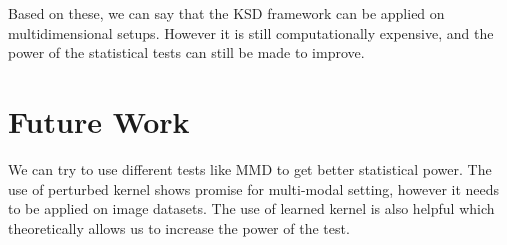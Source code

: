 \documentclass[12pt,a4paper]{report}
\begin{document}
\vspace{0.3cm}
\noindent
Based on these, we can say that the KSD framework can be applied on multidimensional setups. However it is still computationally expensive, and the power of the statistical tests can still be made to improve.

\vspace{0.3cm}
\section{Future Work}
We can try to use different tests like MMD to get better statistical power. The use of perturbed kernel shows promise for multi-modal setting, however it needs to be applied on image datasets. The use of learned kernel is also helpful which theoretically allows us to increase the power of the test.

\printbibliography[heading=bibintoc,title={References}]
\end{document}
